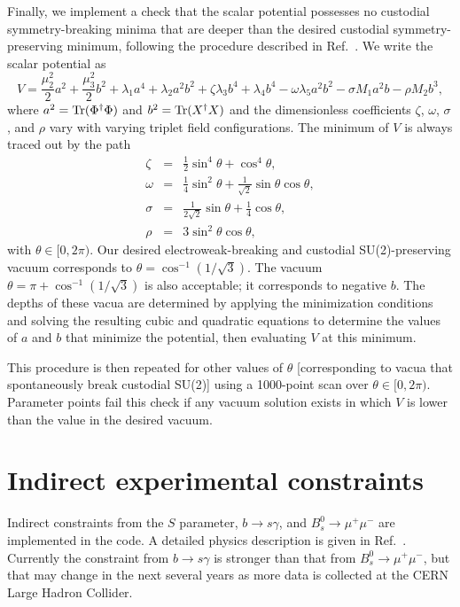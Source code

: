 \documentclass[11pt]{article}
\begin{document}
Finally, we implement a check that the scalar potential possesses no custodial symmetry-breaking minima that are deeper than the desired custodial symmetry-preserving minimum, following the procedure described in Ref.~\cite{HKL}.  We write the scalar potential as
\begin{equation}
	V = \frac{\mu_2^2}{2} a^2 + \frac{\mu_3^2}{2} b^2 + \lambda_1 a^4 + \lambda_2 a^2 b^2
	+ \zeta \lambda_3 b^4 + \lambda_4 b^4 - \omega \lambda_5 a^2 b^2 - \sigma M_1 a^2 b 
	- \rho M_2 b^3,
\end{equation}
where $a^2 = {\rm Tr}(\Phi^{\dagger}\Phi)$ and $b^2 = {\rm Tr}(X^{\dagger}X)$ and the dimensionless coefficients $\zeta$, $\omega$, $\sigma$, and $\rho$ vary with varying triplet field configurations.  The minimum of $V$ is always traced out by the path~\cite{HKL}
\begin{eqnarray}
	\zeta &=& \frac{1}{2} \sin^4 \theta + \cos^4 \theta, \nonumber \\
	\omega &=& \frac{1}{4} \sin^2 \theta + \frac{1}{\sqrt{2}} \sin \theta \cos \theta, \nonumber \\
	\sigma &=& \frac{1}{2\sqrt{2}} \sin \theta + \frac{1}{4} \cos \theta, \nonumber \\
	\rho &=& 3 \sin^2 \theta \cos \theta,
	\label{eq:thetaparam}
\end{eqnarray}
with $\theta \in [0, 2\pi)$.  Our desired electroweak-breaking and custodial SU(2)-preserving vacuum corresponds to $\theta = \cos^{-1} (1/\sqrt{3})$.  The vacuum $\theta = \pi + \cos^{-1} (1/\sqrt{3})$ is also acceptable; it corresponds to negative $b$.  The depths of these vacua are determined by applying the minimization conditions and solving the resulting cubic and quadratic equations to determine the values of $a$ and $b$ that minimize the potential, then evaluating $V$ at this minimum.

This procedure is then repeated for other values of $\theta$ [corresponding to vacua that spontaneously break custodial SU(2)] using a 1000-point scan over $\theta \in [0, 2\pi)$.  Parameter points fail this check if any vacuum solution exists in which $V$ is lower than the value in the desired vacuum.


\section{Indirect experimental constraints}
\label{sec:indir}

Indirect constraints from the $S$ parameter, $b \to s \gamma$, and $B_s^0 \to \mu^+ \mu^-$ are implemented in the code.  A detailed physics description is given in Ref.~\cite{indirect}.  Currently the constraint from $b \to s \gamma$ is stronger than that from $B_s^0 \to \mu^+\mu^-$, but that may change in the next several years as more data is collected at the CERN Large Hadron Collider.
\end{document}
